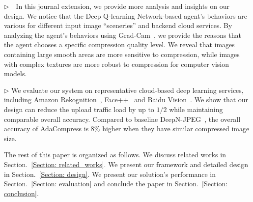 $\rhd$~~In this journal extension, we provide more analysis and insights on our design. We notice that the Deep Q-learning Network-based agent's behaviors are various for different input image “sceneries” and backend cloud services. By analyzing the agent's behaviors using Grad-Cam~\cite{grad-cam}, we provide the reasons that the agent chooses a specific compression quality level. We reveal that images containing large smooth areas are more sensitive to compression, while images with complex textures are more robust to compression for computer vision models.
	
$\rhd$ We evaluate our system on representative cloud-based deep learning services, including Amazon Rekognition~\cite{amazon_rekognition}, Face++~\cite{face++_service} and Baidu Vision~\cite{baidu_vision}. We show that our design can reduce the upload traffic load by up to $1/2$ while maintaining comparable overall accuracy. Compared to baseline DeepN-JPEG~\cite{DeepN-JPEG}, the overall accuracy of AdaCompress is $8\%$ higher when they have similar compressed image size.

The rest of this paper is organized as follows. We discuss related works in Section.~\ref{Section: related_works}. We present our framework and detailed design in Section.~\ref{Section: design}. We present our solution's performance in Section.~\ref{Section: evaluation} and conclude the paper in Section.~\ref{Section: conclusion}.

